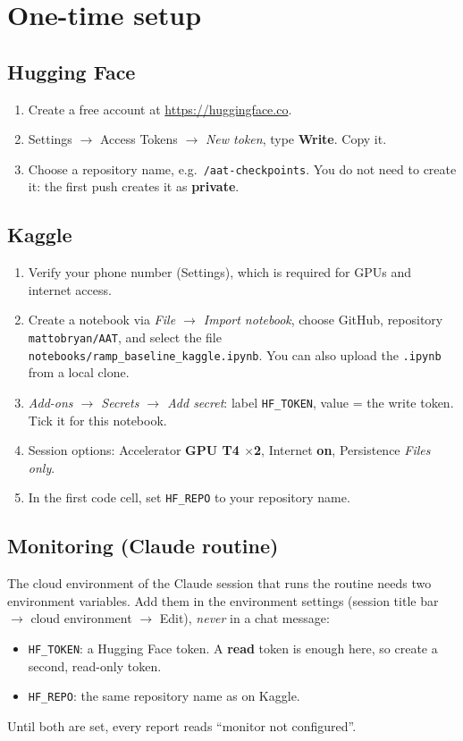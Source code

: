 \documentclass[11pt,a4paper]{article}
\newcommand{\code}[1]{\texttt{\small #1}}
\begin{document}
\section{One-time setup}

\subsection{Hugging Face}
\begin{enumerate}
  \item Create a free account at \url{https://huggingface.co}.
  \item Settings $\rightarrow$ Access Tokens $\rightarrow$ \emph{New token}, type \textbf{Write}. Copy it.
  \item Choose a repository name, e.g.\ \code{<hf-username>/aat-checkpoints}. You do not need to create
        it: the first push creates it as \textbf{private}.
\end{enumerate}

\subsection{Kaggle}
\begin{enumerate}
  \item Verify your phone number (Settings), which is required for GPUs and internet access.
  \item Create a notebook via \emph{File $\rightarrow$ Import notebook}, choose GitHub, repository
        \code{mattobryan/AAT}, and select the file \code{notebooks/ramp\_baseline\_kaggle.ipynb}.
        You can also upload the \code{.ipynb} from a local clone.
  \item \emph{Add-ons $\rightarrow$ Secrets $\rightarrow$ Add secret}: label \code{HF\_TOKEN}, value = the
        write token. Tick it for this notebook.
  \item Session options: Accelerator \textbf{GPU T4 $\times$2}, Internet \textbf{on}, Persistence
        \emph{Files only}.
  \item In the first code cell, set \code{HF\_REPO} to your repository name.
\end{enumerate}

\subsection{Monitoring (Claude routine)}
The cloud environment of the Claude session that runs the routine needs two environment variables.
Add them in the environment settings (session title bar $\rightarrow$ cloud environment $\rightarrow$
Edit), \emph{never} in a chat message:
\begin{itemize}
  \item \code{HF\_TOKEN}: a Hugging Face token. A \textbf{read} token is enough here, so create a
        second, read-only token.
  \item \code{HF\_REPO}: the same repository name as on Kaggle.
\end{itemize}
Until both are set, every report reads ``monitor not configured''.
\end{document}
